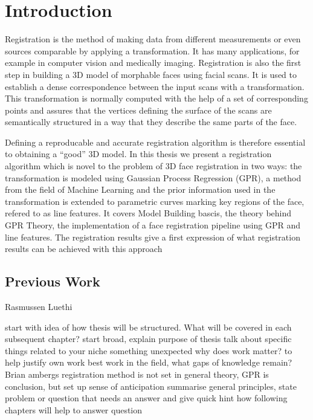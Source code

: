 \chapter{Introduction}
Registration is the method of making data from different measurements or even sources comparable by applying a transformation. It has many applications, for example in computer vision and medically imaging.
Registration is also the first step in building a 3D model of morphable faces using facial scans. It is used to establish a dense correspondence between the input scans with a transformation. This transformation is normally computed with the help of a set of corresponding points and assures that the vertices defining the surface of the scans are semantically structured in a way that they describe the same parts of the face. \begin{comment}Correspondence betweenk two faces is established by deforming a template face on to a target face.\end{comment} Defining a reproducable and accurate registration algorithm is therefore essential to obtaining a ``good'' 3D model. 
In this thesis we present a registration algorithm which is novel to the problem of 3D  face registration in two ways: the transformation is modeled using Gaussian Process Regression (GPR), a method from the field of Machine Learning and the prior information used in the transformation is extended to parametric curves marking key regions of the face, refered to as line features. It covers Model Building bascis, the theory behind GPR Theory, the implementation of a
face registration pipeline using GPR and line features. The registration results give a first expression of what registration results can be achieved with this approach

\section{Previous Work}
Rasmussen
Luethi



start with idea of how thesis will be structured. What will be covered in each subsequent chapter?
start broad, explain purpose of thesis
talk about specific things related to your niche
something unexpected
why does work matter? to help justify own work
best work in the field, what gaps of knowledge remain? Brian ambergs registration method is not set in general theory, GPR is
conclusion, but set up sense of anticipation
summarise general principles, state problem or question that needs an answer and give quick hint how following chapters will help to answer question


